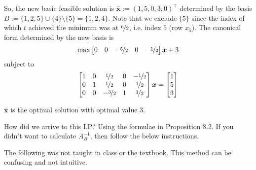\begin{exbox}
    \begin{example}
        So, the new basic feasible solution is $\bm{\bar{x}}:=(1,5,0,3,0)^\top$
        determined by the basis $B:=\{1,2,5\}\cup\{4\}\setminus \{5\}=\{1,2,4\}$. Note that
        we exclude $\{5\}$ since the index of which $t$ achieved the minimum was at
        $\nicefrac{6}{2}$, i.e. index $5$ (row $x_5$). The canonical form determined by the new
        basis is
        \[\max \begin{bmatrix}
                0 & 0 & -\nicefrac{5}{2} & 0 & -\nicefrac{1}{2}
            \end{bmatrix}\bm{x}+3\]
        subject to
        \[
            \begin{bmatrix}
                1 & 0 & \nicefrac{1}{2}  & 0 & -\nicefrac{1}{2} \\
                0 & 1 & \nicefrac{1}{2}  & 0 & \nicefrac{1}{2}  \\
                0 & 0 & -\nicefrac{3}{2} & 1 & \nicefrac{1}{2}
            \end{bmatrix}\bm{x}
            =
            \begin{bmatrix}
                1 \\
                5 \\
                3
            \end{bmatrix}
        \]
    \end{example}
\end{exbox}

\begin{remark}
    $\bm{\bar{x}}$ is the optimal solution with optimal value $3$.
\end{remark}
\begin{remark}
    How did we arrive to this LP? Using the formulae in Proposition 8.2. If you didn't want to
    calculate $A_B^{-1}$, then follow the below instructions.
\end{remark}

\begin{remark}
    The following was not taught in class or the textbook.
    This method can be confusing and not intuitive.
\end{remark}

